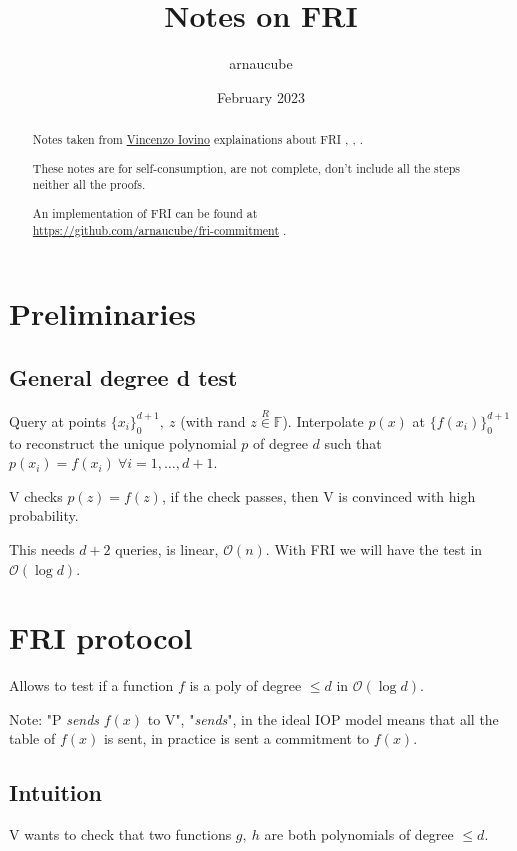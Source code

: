 \documentclass{article}
\title{Notes on FRI}
\author{arnaucube}
\date{February 2023}
\theoremstyle{definition}
\begin{document}
\maketitle

\begin{abstract}
	Notes taken from \href{https://sites.google.com/site/vincenzoiovinoit/}{Vincenzo Iovino} \cite{vincenzoiovino} explainations about FRI \cite{fri}, \cite{cryptoeprint:2022/1216}, \cite{cryptoeprint:2019/1020}.

	These notes are for self-consumption, are not complete, don't include all the steps neither all the proofs.

	An implementation of FRI can be found at\\ \href{https://github.com/arnaucube/fri-commitment}{https://github.com/arnaucube/fri-commitment} \cite{fri-impl}.
\end{abstract}

\tableofcontents

\section{Preliminaries}
\subsection{General degree d test}

Query at points $\{ x_i \}_0^{d+1},~z$ (with rand $z \overset{R}{\in} \mathbb{F}$).
Interpolate $p(x)$ at $\{f(x_i)\}_0^{d+1}$ to reconstruct the unique polynomial $p$ of degree $d$ such that $p(x_i)=f(x_i)~\forall i=1, \ldots, d+1$.

V checks $p(z)=f(z)$, if the check passes, then V is convinced with high probability.

This needs $d+2$ queries, is linear, $\mathcal{O}(n)$. With FRI we will have the test in $\mathcal{O}(\log{}d)$.

\section{FRI protocol}
Allows to test if a function $f$ is a poly of degree $\leq d$ in $\mathcal{O}(\log{}d)$.

Note: "P \emph{sends} $f(x)$ to V", "\emph{sends}", in the ideal IOP model means that all the table of $f(x)$ is sent, in practice is sent a commitment to $f(x)$.

\subsection{Intuition}
V wants to check that two functions $g,~h$ are both polynomials of degree $\leq d$.
\end{document}
